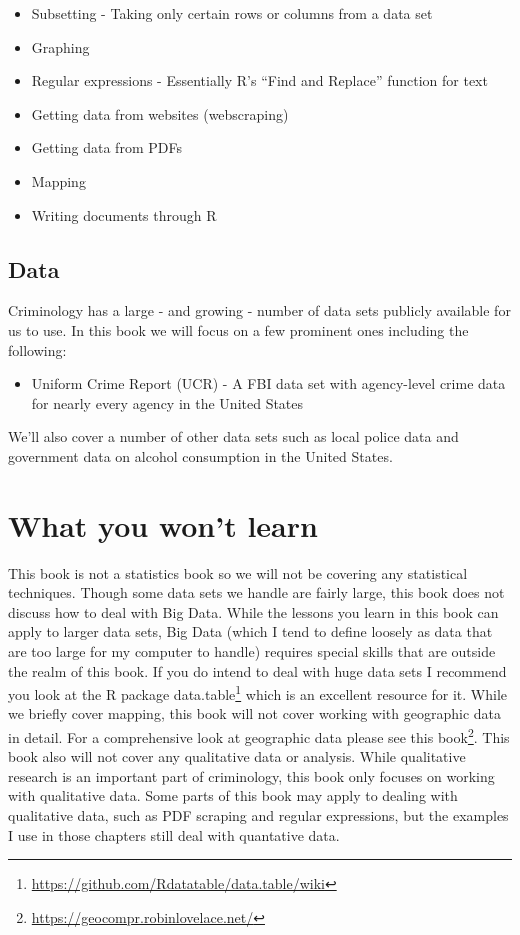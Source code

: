 \documentclass[
]{krantz}
\providecommand{\tightlist}{%
  \setlength{\itemsep}{0pt}\setlength{\parskip}{0pt}}
\renewcommand{\href}[2]{#2\footnote{\url{#1}}}
\begin{document}
\begin{itemize}
\tightlist
\item
  Subsetting - Taking only certain rows or columns from a data set
\item
  Graphing
\item
  Regular expressions - Essentially R's ``Find and Replace'' function for text
\item
  Getting data from websites (webscraping)
\item
  Getting data from PDFs
\item
  Mapping
\item
  Writing documents through R
\end{itemize}

\hypertarget{data}{%
\subsection{Data}\label{data}}

Criminology has a large - and growing - number of data sets publicly available for us to use. In this book we will focus on a few prominent ones including the following:

\begin{itemize}
\tightlist
\item
  Uniform Crime Report (UCR) - A FBI data set with agency-level crime data for nearly every agency in the United States
\end{itemize}

We'll also cover a number of other data sets such as local police data and government data on alcohol consumption in the United States.

\hypertarget{what-you-wont-learn}{%
\section{What you won't learn}\label{what-you-wont-learn}}

This book is not a statistics book so we will not be covering any statistical techniques. Though some data sets we handle are fairly large, this book does not discuss how to deal with Big Data. While the lessons you learn in this book can apply to larger data sets, Big Data (which I tend to define loosely as data that are too large for my computer to handle) requires special skills that are outside the realm of this book. If you do intend to deal with huge data sets I recommend you look at the R package \href{https://github.com/Rdatatable/data.table/wiki}{data.table} which is an excellent resource for it. While we briefly cover mapping, this book will not cover working with geographic data in detail. For a comprehensive look at geographic data please see this \href{https://geocompr.robinlovelace.net/}{book}. This book also will not cover any qualitative data or analysis. While qualitative research is an important part of criminology, this book only focuses on working with qualitative data. Some parts of this book may apply to dealing with qualitative data, such as PDF scraping and regular expressions, but the examples I use in those chapters still deal with quantative data.
\end{document}
